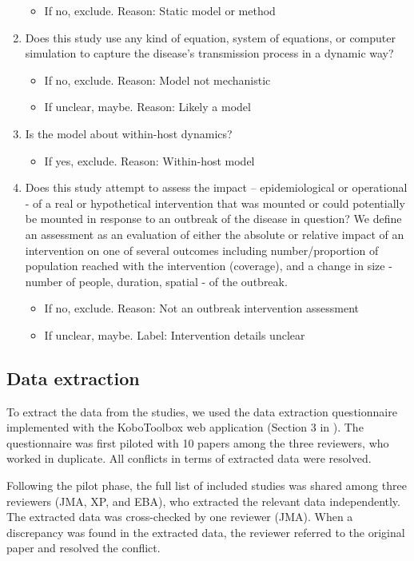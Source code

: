 \documentclass[10pt,letterpaper]{article}
\begin{document}
\begin{enumerate}
\begin{itemize}
		\item 	If no, exclude. Reason: Static model or method
	\end{itemize}
	\item Does this study use any kind of equation, system of equations, or computer simulation to capture the disease’s transmission process in a dynamic way?
	\begin{itemize}
		\item 	If no, exclude. Reason: Model not mechanistic
		\item 	If unclear, maybe. Reason: Likely a model
	\end{itemize}
	\item Is the model about within-host dynamics?
	\begin{itemize}
		\item 	If yes, exclude. Reason: Within-host model
	\end{itemize}
	\item Does this study attempt to assess the impact – epidemiological or operational - of a real or hypothetical intervention that was mounted or could potentially be mounted in response to an outbreak of the disease in question? We define an assessment as an evaluation of either the absolute or relative impact of an intervention on one of several outcomes including number/proportion of population reached with the intervention (coverage), and a change in size - number of people, duration, spatial - of the outbreak.
	\begin{itemize}
		\item 	If no, exclude. Reason: Not an outbreak intervention assessment
		\item 	If unclear, maybe. Label: Intervention details unclear
	\end{itemize}
\end{enumerate}

\subsection*{Data extraction}
To extract the data from the studies, we used the data extraction questionnaire implemented with the KoboToolbox web application (Section 3 in ). The questionnaire was first piloted with 10 papers among the three reviewers, who worked in duplicate. All conflicts in terms of extracted data were resolved. 

Following the pilot phase, the full list of included studies was shared among three reviewers (JMA, XP, and EBA), who extracted the relevant data independently. The extracted data was cross-checked by one reviewer (JMA). When a discrepancy was found in the extracted data, the reviewer referred to the original paper and resolved the conflict.  
\end{document}
